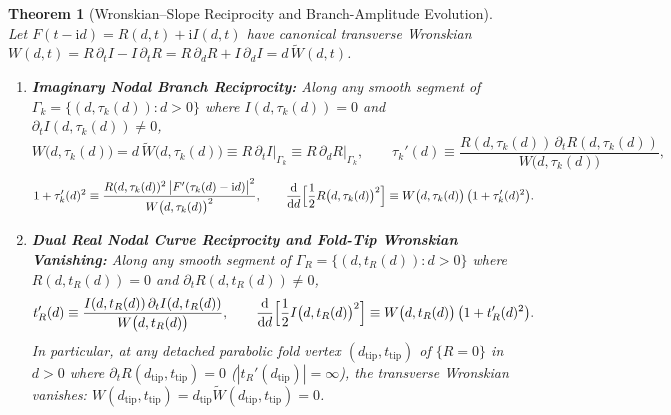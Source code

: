 \documentclass[11pt,reqno]{amsart}
\newtheorem{theorem}{Theorem}[section]
\theoremstyle{definition}
\theoremstyle{remark}
\numberwithin{equation}{section}
\newcommand{\dd}{\mathrm{d}}
\newcommand{\ii}{\mathrm{i}}
\begin{document}
\begin{theorem}[Wronskian--Slope Reciprocity and Branch-Amplitude Evolution]\label{thm:wronskian-slope-reciprocity}
Let $F(t-\ii d) = R(d,t) + \ii I(d,t)$ have canonical transverse Wronskian $W(d,t) = R\,\partial_t I - I\,\partial_t R = R\,\partial_d R + I\,\partial_d I = d\,\widetilde{W}(d,t)$.
\begin{enumerate}[label=\upshape(\alph*),leftmargin=2.2em]
\item \textbf{Imaginary Nodal Branch Reciprocity:} Along any smooth segment of $\Gamma_k = \{(d,\tau_k(d)) : d > 0\}$ where $I(d,\tau_k(d))=0$ and $\partial_t I(d,\tau_k(d)) \ne 0$,
\begin{equation}\label{eq:wall-W-identities}
W\bigl(d,\tau_k(d)\bigr) = d\,\widetilde{W}\bigl(d,\tau_k(d)\bigr) \equiv R\,\partial_t I\Big|_{\Gamma_k} \equiv R\,\partial_d R\Big|_{\Gamma_k}, \qquad \tau_k'(d) \equiv \frac{R(d,\tau_k(d))\,\partial_t R(d,\tau_k(d))}{W\bigl(d,\tau_k(d)\bigr)},
\end{equation}
\begin{equation}\label{eq:wall-amplitude-law}
1 + \tau_k'(d)^2 \equiv \frac{R(d,\tau_k(d))^2\,\bigl|F'(\tau_k(d)-\ii d)\bigr|^2}{W\bigl(d,\tau_k(d)\bigr)^2}, \qquad \frac{\dd}{\dd d}\Bigl[\frac{1}{2}R\bigl(d,\tau_k(d)\bigr)^2\Bigr] \equiv W\bigl(d,\tau_k(d)\bigr)\,\bigl(1 + \tau_k'(d)^2\bigr).
\end{equation}
\item \textbf{Dual Real Nodal Curve Reciprocity and Fold-Tip Wronskian Vanishing:} Along any smooth segment of $\Gamma_R = \{(d,t_R(d)) : d > 0\}$ where $R(d,t_R(d))=0$ and $\partial_t R(d,t_R(d))\ne 0$,
\begin{equation}\label{eq:dual-real-reciprocity}
t_R'(d) \equiv \frac{I(d,t_R(d))\,\partial_t I(d,t_R(d))}{W\bigl(d,t_R(d)\bigr)}, \qquad \frac{\dd}{\dd d}\Bigl[\frac{1}{2}I\bigl(d,t_R(d)\bigr)^2\Bigr] \equiv W\bigl(d,t_R(d)\bigr)\,\bigl(1 + t_R'(d)^2\bigr).
\end{equation}
In particular, at any detached parabolic fold vertex $(d_{\mathrm{tip}},t_{\mathrm{tip}})$ of $\{R=0\}$ in $d>0$ where $\partial_t R(d_{\mathrm{tip}},t_{\mathrm{tip}})=0$ ($|t_R'(d_{\mathrm{tip}})|=\infty$), the transverse Wronskian vanishes: $W(d_{\mathrm{tip}},t_{\mathrm{tip}}) = d_{\mathrm{tip}}\widetilde{W}(d_{\mathrm{tip}},t_{\mathrm{tip}}) = 0$.
\end{enumerate}
\end{theorem}
\end{document}
